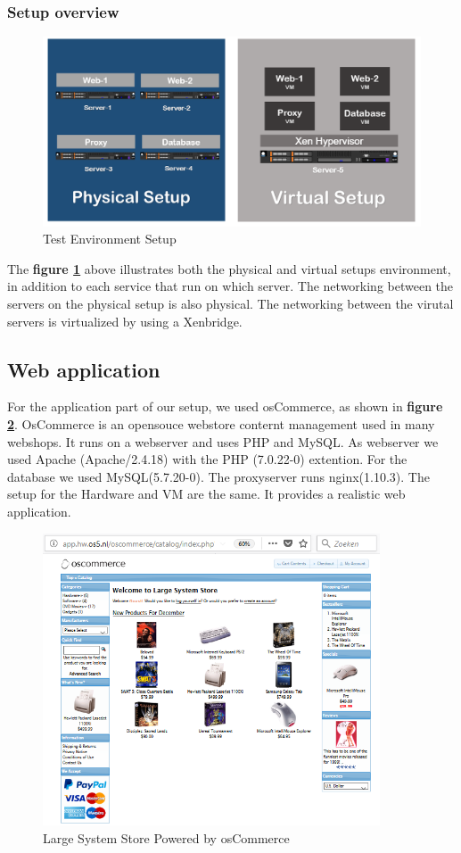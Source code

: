 \subsubsection{Setup overview}
\begin{figure}[H]
    \centering
    \includegraphics[width=14cm]{Pictures/setup.PNG}
    \caption{Test Environment Setup}
    \label{fig:setupoverview}
\end{figure}

The \textbf{figure \ref{fig:setupoverview}} above illustrates both the physical and virtual setups environment, in addition to each service that run on which server. The networking between the servers on the physical setup is also physical. The networking between the virutal servers is virtualized by using a Xenbridge.

\subsection{Web application}
For the application part of our setup, we used osCommerce\cite{oscommerce}, as shown in \textbf{figure \ref{fig:osCommerce}}. OsCommerce is an opensouce webstore conternt management used in many webshops. It runs on a webserver and uses PHP and MySQL. As webserver we used Apache (Apache/2.4.18) with the PHP (7.0.22-0)  extention. For the database we used MySQL(5.7.20-0). The proxyserver runs nginx(1.10.3). The setup for the Hardware and VM are the same. It provides a realistic web application.

\begin{figure}[H]
    \centering
    \includegraphics[width=10cm]{Pictures/oscom.PNG}
    \caption{Large System Store \- Powered by osCommerce}
    \label{fig:osCommerce}
\end{figure}

